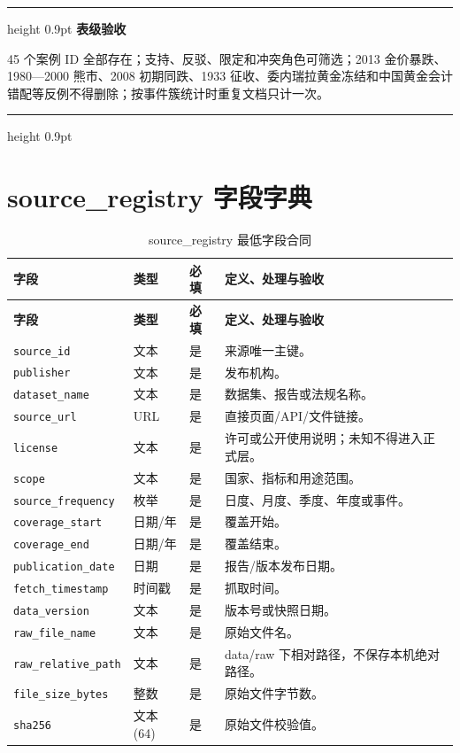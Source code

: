 \documentclass[UTF8,fontset=windows,12pt,openany]{ctexbook}
\newenvironment{gatebox}[1][]{%
  \par\medskip\noindent\begin{center}\begin{minipage}{0.93\textwidth}%
  \color{GoldLine}\hrule height 0.9pt\vspace{0.45em}%
  \textbf{#1}\par\smallskip\color{black}%
}{%
  \par\vspace{0.35em}\color{GoldLine}\hrule height 0.9pt%
  \end{minipage}\end{center}\medskip%
}
\newcommand{\Field}[1]{{\small\nolinkurl{#1}}}
\begin{document}
\begin{gatebox}[表级验收]
45 个案例 ID 全部存在；支持、反驳、限定和冲突角色可筛选；2013 金价暴跌、1980—2000 熊市、2008 初期同跌、1933 征收、委内瑞拉黄金冻结和中国黄金会计错配等反例不得删除；按事件簇统计时重复文档只计一次。
\end{gatebox}

\chapter{source\_registry 字段字典}

\begin{longtable}{p{3.7cm}p{2.3cm}p{2.1cm}p{5.1cm}}
\caption{source\_registry 最低字段合同}\label{tab:dict-source}\\
\toprule
\textbf{字段} & \textbf{类型} & \textbf{必填} & \textbf{定义、处理与验收}\\
\midrule
\endfirsthead
\toprule \textbf{字段} & \textbf{类型} & \textbf{必填} & \textbf{定义、处理与验收}\\ \midrule
\endhead
\Field{source_id} & 文本 & 是 & 来源唯一主键。\\
\Field{publisher} & 文本 & 是 & 发布机构。\\
\Field{dataset_name} & 文本 & 是 & 数据集、报告或法规名称。\\
\Field{source_url} & URL & 是 & 直接页面/API/文件链接。\\
\Field{license} & 文本 & 是 & 许可或公开使用说明；未知不得进入正式层。\\
\Field{scope} & 文本 & 是 & 国家、指标和用途范围。\\
\Field{source_frequency} & 枚举 & 是 & 日度、月度、季度、年度或事件。\\
\Field{coverage_start} & 日期/年 & 是 & 覆盖开始。\\
\Field{coverage_end} & 日期/年 & 是 & 覆盖结束。\\
\Field{publication_date} & 日期 & 是 & 报告/版本发布日期。\\
\Field{fetch_timestamp} & 时间戳 & 是 & 抓取时间。\\
\Field{data_version} & 文本 & 是 & 版本号或快照日期。\\
\Field{raw_file_name} & 文本 & 是 & 原始文件名。\\
\Field{raw_relative_path} & 文本 & 是 & data/raw 下相对路径，不保存本机绝对路径。\\
\Field{file_size_bytes} & 整数 & 是 & 原始文件字节数。\\
\Field{sha256} & 文本(64) & 是 & 原始文件校验值。\\

\end{longtable}
\end{document}
